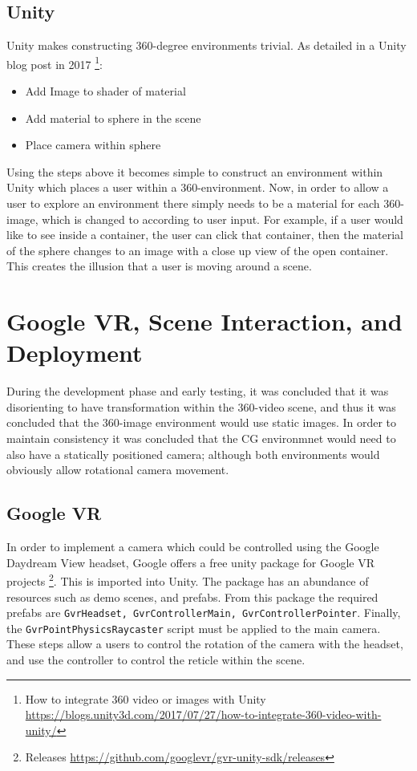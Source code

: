 \documentclass[ %
                    author={Elis Jones},
                supervisor={Dr. Kirsten Cater},
                    degree={BSc},
                     title={The Effect of Presentation Medium on Spatial Cognition},
                  subtitle={in the Virtual Environment},
                      year={2018} ]{dissertation}
\begin{document}
\subsection{Unity}
Unity makes constructing 360-degree environments trivial. As detailed in a Unity blog post in 2017 \footnote{How to integrate 360 video or images with Unity \url{https://blogs.unity3d.com/2017/07/27/how-to-integrate-360-video-with-unity/}}: 

\begin{itemize}
\item Add Image to shader of material
\item Add material to sphere in the scene
\item Place camera within sphere
\end{itemize}

Using the steps above it becomes simple to construct an environment within Unity which places a user within a 360-environment. Now, in order to allow a user to explore an environment there simply needs to be a material for each 360-image, which is changed to according to user input. For example, if a user would like to see inside a container, the user can click that container, then the material of the sphere changes to an image with a close up view of the open container. This creates the illusion that a user is moving around a scene. 

\section{Google VR, Scene Interaction, and Deployment}
During the development phase and early testing, it was concluded that it was disorienting to have transformation within the 360-video scene, and thus it was concluded that the 360-image environment would use static images. In order to maintain consistency it was concluded that the CG environmnet would need to also have a statically positioned camera; although both environments would obviously allow rotational camera movement.  

\subsection{Google VR}\label{googlevr}

In order to implement a camera which could be controlled using the Google Daydream View headset, Google offers a free unity package for Google VR projects \footnote{Releases \url{https://github.com/googlevr/gvr-unity-sdk/releases}}. This is imported into Unity. The package has an abundance of resources such as demo scenes, and prefabs. From this package the required prefabs are \lstinline{GvrHeadset, GvrControllerMain, GvrControllerPointer}. Finally, the \lstinline{GvrPointPhysicsRaycaster} script must be applied to the main camera. These steps allow a users to control the rotation of the camera with the headset, and use the controller to control the reticle within the scene. 
\end{document}

